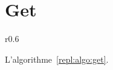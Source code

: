 \clearpage

\section{Get}

\begin{wrapfigure}{r}{0.6\textwidth}
  \vspace{-35pt} %
  \begin{minipage}[t]{0.6\textwidth}
    \begin{algorithm}[H]
      
      \caption{\label{repl:algo:get} Get.}
    \end{algorithm}
  \end{minipage}
  \vspace{-15pt}
\end{wrapfigure}

L'algorithme~\ref{repl:algo:get}.